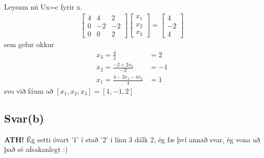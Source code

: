 \documentclass[11pt]{article}
\begin{document}
Leysum nú Ux=c fyrir x.
\begin{align*}
\begin{bmatrix} %
4 & 4 & 2\\
0 & -2& -2\\
0 & 0 & 2
\end{bmatrix}
\begin{bmatrix}
x_1\\
x_2\\
x_3
\end{bmatrix}
=
\begin{bmatrix}
4\\
-2\\
4
\end{bmatrix}
\end{align*}
sem gefur okkur
\begin{align*}
x_3 = \frac 42 &= 2\\
x_2 = \frac{-2 +2 x_3}{-2} &= -1\\
x_1 = \frac{4-2x_3-4x_2}{4} &= 1
\end{align*}
svo við fáum að $[x_1, x_2, x_3] = [1, -1, 2]$


\subsection*{Svar(b)}
\textbf{ATH!} Ég setti óvart '1' í stað '2' í línu 3 dálk 2, ég fæ því annað svar, ég vona að það sé afsakanlegt :) \\ 
\medskip
\end{document}
